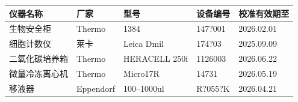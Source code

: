 \documentclass[UTF8,10pt,a4paper,fontset=fandol]{ctexart}
\newcommand{\fieldvalue}[1]{#1}
\newcommand{\handwritten}[1]{#1}
\begin{document}
\begin{center}
\small
\begin{tabular}{|p{3.2cm}|p{2.1cm}|p{3.2cm}|p{3.0cm}|p{3.2cm}|}
\hline
仪器名称 & 厂家 & 型号 & 设备编号 & 校准有效期至\\
\hline
生物安全柜 &
\fieldvalue{Thermo} &
\fieldvalue{\handwritten{1384}} &
\fieldvalue{\handwritten{147?001}} &
\fieldvalue{\handwritten{2026.02.01}}\\
\hline
细胞计数仪 &
\fieldvalue{莱卡} &
\fieldvalue{Leica Dmil} &
\fieldvalue{\handwritten{174?03}} &
\fieldvalue{\handwritten{2025.09.09}}\\
\hline
二氧化碳培养箱 &
\fieldvalue{Thermo} &
\fieldvalue{HERACELL 250i} &
\fieldvalue{1126003} &
\fieldvalue{2026.06.22}\\
\hline
微量冷冻离心机 &
\fieldvalue{Thermo} &
\fieldvalue{Micro17R} &
\fieldvalue{14731} &
\fieldvalue{2026.05.19}\\
\hline
移液器 &
\fieldvalue{Eppendorf} &
\fieldvalue{\handwritten{100--1000ul}} &
\fieldvalue{\handwritten{R?055?K}} &
\fieldvalue{\handwritten{2026.04.21}}\\
\hline
\end{tabular}
\end{center}
\end{document}
